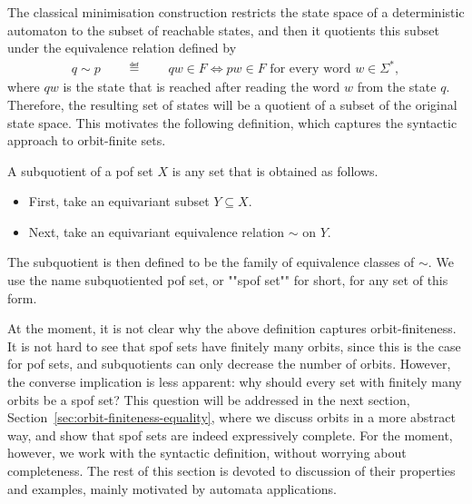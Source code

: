 The classical minimisation construction restricts the state space of a deterministic automaton to  the subset of reachable states, and then it quotients this subset under the  equivalence relation defined by 
\begin{align*}
q \sim p \qquad \eqdef \qquad qw \in F \Leftrightarrow pw \in F \text{ for every word $w \in \Sigma^*$},
\end{align*}
where $qw$ is the state that is reached after reading the word $w$ from the state $q$. Therefore, the resulting set of states will be a quotient of a subset of the original state space. This motivates the following definition, which captures the syntactic approach to orbit-finite sets.

\begin{definition}
    A subquotient of a pof set $X$ is any set that is obtained as follows.
    \begin{itemize}
        \item First, take an equivariant subset $Y \subseteq X$.
        \item Next, take an equivariant equivalence relation $\sim$ on $Y$.
    \end{itemize}
    The subquotient is then defined to be the family of equivalence classes of $\sim$. We use the name subquotiented pof set, or ""spof set"" for short, for any set of this form.
\end{definition}

At the moment, it is not clear why the above definition captures orbit-finiteness. It is not hard to see that spof sets have finitely many orbits, since this is the case for pof sets, and subquotients can only decrease the number of orbits. However, the converse implication is less apparent: why should every set with finitely many orbits be a spof set? This question will be addressed in the next section, Section~\ref{sec:orbit-finiteness-equality}, where we discuss orbits in a more abstract way, and show that spof sets are indeed expressively complete. For the moment, however, we work with the syntactic definition, without worrying about completeness. 
 The rest of this section is devoted to discussion of their properties and examples, mainly motivated by automata applications.

